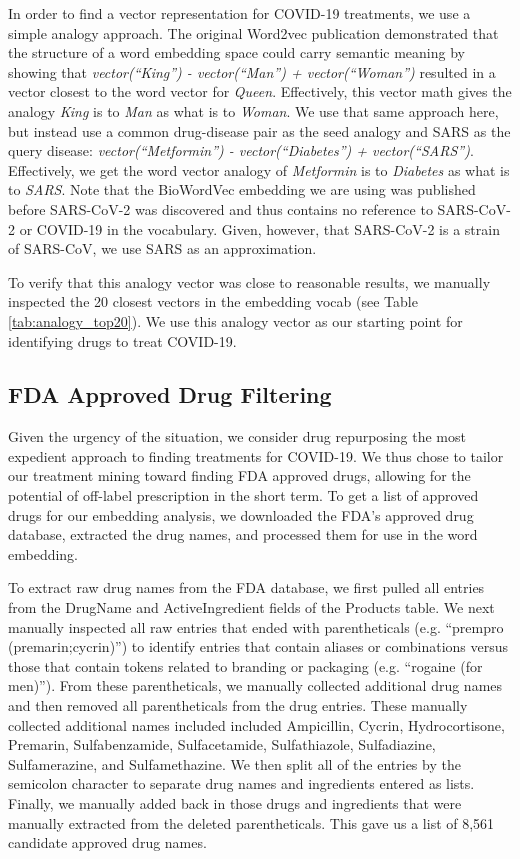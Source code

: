 \documentclass{article}
\begin{document}
In order to find a vector representation for COVID-19 treatments, we use a simple analogy approach.
The original Word2vec publication demonstrated that the structure of a word embedding space could carry semantic meaning by showing that \emph{vector(``King'') - vector(``Man'') + vector(``Woman'')} resulted in a vector closest to the word vector for \emph{Queen}\cite{mikolov2013efficient}.
Effectively, this vector math gives the analogy \emph{King} is to \emph{Man} as what is to \emph{Woman}.
We use that same approach here, but instead use a common drug-disease pair as the seed analogy and SARS as the query disease: \emph{vector(``Metformin'') - vector(``Diabetes'') + vector(``SARS'')}.
Effectively, we get the word vector analogy of \emph{Metformin} is to \emph{Diabetes} as what is to \emph{SARS}.
Note that the BioWordVec embedding we are using was published before SARS-CoV-2 was discovered and thus contains no reference to SARS-CoV-2 or COVID-19 in the vocabulary.
Given, however, that SARS-CoV-2 is a strain of SARS-CoV\cite{of2020species}, we use SARS as an approximation.

To verify that this analogy vector was close to reasonable results, we manually inspected the 20 closest vectors in the embedding vocab (see Table \ref{tab:analogy_top20}).
We use this analogy vector as our starting point for identifying drugs to treat COVID-19.


\subsection{FDA Approved Drug Filtering}

Given the urgency of the situation, we consider drug repurposing the most expedient approach to finding treatments for COVID-19.
We thus chose to tailor our treatment mining toward finding FDA approved drugs, allowing for the potential of off-label prescription in the short term.
To get a list of approved drugs for our embedding analysis, we downloaded the FDA's approved drug database\cite{fdadrugs}, extracted the drug names, and processed them for use in the word embedding.

To extract raw drug names from the FDA database, we first pulled all entries from the DrugName and ActiveIngredient fields of the Products table.
We next manually inspected all raw entries that ended with parentheticals (e.g. ``prempro (premarin;cycrin)'') to identify entries that contain aliases or combinations versus those that contain tokens related to branding or packaging (e.g. ``rogaine (for men)'').
From these parentheticals, we manually collected additional drug names and then removed all parentheticals from the drug entries.
These manually collected additional names included included Ampicillin, Cycrin, Hydrocortisone, Premarin, Sulfabenzamide, Sulfacetamide, Sulfathiazole, Sulfadiazine, Sulfamerazine, and Sulfamethazine.
We then split all of the entries by the semicolon character to separate drug names and ingredients entered as lists.
Finally, we manually added back in those drugs and ingredients that were manually extracted from the deleted parentheticals.
This gave us a list of 8,561 candidate approved drug names.
\end{document}
